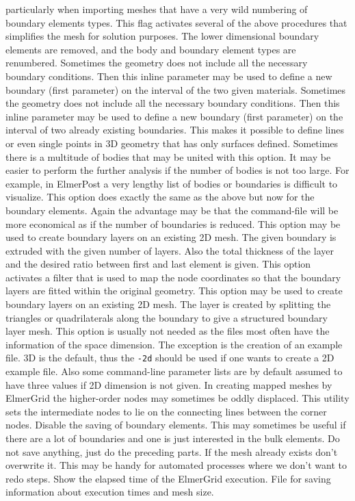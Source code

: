 particularly when importing meshes that have a very wild numbering of boundary elements types.
%
This flag activates several of the above procedures that simplifies the mesh
for solution purposes. The lower dimensional boundary elements are removed, 
and the body and boundary element types are renumbered.
%
Sometimes the geometry does not include all the necessary boundary conditions. 
Then this inline parameter may be used to define a new boundary 
(first parameter) on the interval of the two given materials.
%
Sometimes the geometry does not include all the necessary boundary conditions. 
Then this inline parameter may be used to define a new boundary 
(first parameter) on the interval of two already existing boundaries.
This makes it possible to define lines or even single points 
in 3D geometry that has only surfaces defined.
%
Sometimes there is a multitude of bodies that may be united with this option.
It may be easier to perform the further analysis if the number of bodies 
is not too large.
For example, in ElmerPost a very lengthy list of bodies or 
boundaries is difficult to visualize. 
%
This option does exactly the same as the above but now for the boundary
 elements.
Again the advantage may be that the command-file will be more economical as 
if the number of boundaries is reduced.
%
This option may be used to create boundary layers on an existing 2D mesh.
The given boundary is extruded with the given number of layers. Also the total
thickness of the layer and the desired ratio between first and last element
is given.
%
This option activates a filter that is used to map the node coordinates 
so that the boundary layers are fitted within the original geometry.
%
This option may be used to create boundary layers on an existing 2D mesh.
The layer is created by splitting the triangles or quadrilaterals 
along the boundary to give a structured boundary layer mesh.
%
This option is usually not needed as the files most often have the information
of the space dimension. The exception is the creation of an example file.
3D is the default, thus the \texttt{-2d} should be used if one wants to create
a 2D example file. Also some command-line parameter lists are by default assumed to have 
three values if 2D dimension is not given.
%
In creating mapped meshes by ElmerGrid the higher-order nodes may sometimes be 
oddly displaced. This utility sets the intermediate nodes to lie on the connecting lines
between the corner nodes. 
%
Disable the saving of boundary elements.
This may sometimes be useful if there are a lot of boundaries and one is just interested 
in the bulk elements.
%
Do not save anything, just do the preceding parts.
%
If the mesh already exists don't overwrite it. This may be handy for automated
processes where we don't want to redo steps.
%
Show the elapsed time of the ElmerGrid execution.
%
File for saving information about execution times and mesh size.
\sifend
%


